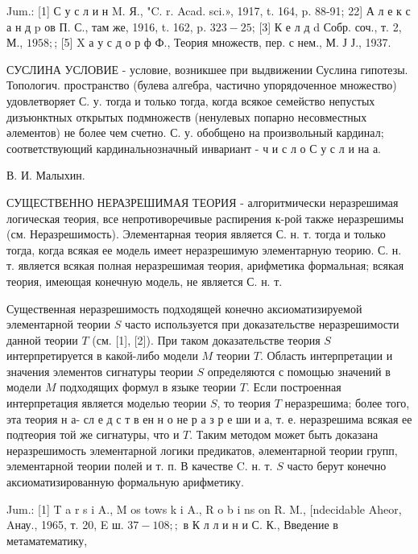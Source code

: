 \documentclass[10pt]{article}
\begin{document}
Jum.: [1] С у с л и н M. Я., "C. r. Acad. sci.», 1917, t. 164, p. 88-91; 22] А л е к с а н д p ов П. С., там же, 1916, t. 162, p. $323-25$; [3] К е $л$ д d Собр. соч., т. 2, М., $1958 ;$; [5] $\mathrm{X}$ а у с д о р ф Ф., Теория множеств, пер. с нем., М. Ј Ј., 1937.



СУСЛИНА УСЛОВИЕ - условие, возникшее при выдвижении Суслина гипотезы. Топологич. пространство (булева алгебра, частично упорядоченное множество) удовлетворяет С. у. тогда и только тогда, когда всякое семейство непустых дизъюнктных открытых подмножеств (ненулевых попарно несовместных әлементов) не более чем счетно. С. у. обобщено на произвольный кардинал; соответствующий кардинальнозначный инвариант - ч и с л о С у с л и на а.



В. И. Малыхин.



СУЩЕСТВЕННО НЕРАЗРЕШИМАЯ ТЕОРИЯ - алгоритмически неразрешимая логическая теория, все непротиворечивые распирения к-рой также неразрешимы (см. Неразрешимость). Элементарная теория является С. н. т. тогда и только тогда, когда всякая ее модель имеет неразрешимую элементарную теорию. С. н. т. является всякая полная неразрешимая теория, арифметика формальная; всякая теория, имеющая конечную модель, не является С. н. т.



Существенная неразрешимость подходящей конечно аксиоматизируемой элементарной теории $S$ часто используется при доказательстве неразрешимости данной теории $T$ (см. [1], [2]). При таком доказательстве теория $S$ интерпретируется в какой-либо модели $M$ теории $T$. Область интерпретации и значения элементов сигнатуры теории $S$ определяются с помощью значений в модели $M$ подходящих формул в языке теории $T$. Если построенная интерпретация является моделью теории $S$, то теория $T$ неразрешима; более того, эта теория н а- сл е д с т в ен н о не р а з р е ши и а, т. е. неразрешима всякая ее подтеория той же сигнатуры, что и $T$. Таким методом может быть доказана неразрешимость элементарной логики предикатов, әлементарной теории групп, элементарной теории полей и т. п. В качестве C. н. т. $S$ часто берут конечно аксиоматизированную формальную арифметику.



Jum.: [1] T a r s i A., M os tows k i A., R o b i ns on R. M., [ndecidable Aheor, Aнау., 1965, т. 20, E ш. $37-108 ; ;$ в К л л и н и С. К., Введение в метаматематику,
\end{document}

